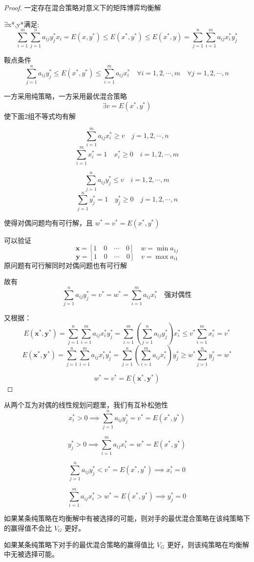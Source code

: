 \documentclass[12pt, a4paper, oneside, UTF8]{ctexbook}
\begin{document}
\begin{proof}
    一定存在混合策略对意义下的矩阵博弈均衡解

$\exists$x*,y*满足:
$$\sum_{i=1}^{m}\sum_{j=1}^{n}a_{ij}y_{j}^{*}x_{i}=E(x,y^{*})\leq E(x^{*},y^{*})\leq E(x^{*},y)=\sum_{j=1}^{n}\sum_{i=1}^{m}a_{ij}x_{i}^{*}y_{j}^{*}$$

鞍点条件
$$\sum_{j=1}^{n}a_{ij}y_{j}^{*}\leq E(x^{*},y^{*})\leq \sum_{i=1}^{m}a_{ij}x_{i}^{*} \quad \forall i=1,2,\cdots,m \quad \forall j=1,2,\cdots,n$$

一方采用纯策略，一方采用最优混合策略
$$\exists v=E(x^{*},y^{*})$$ 使下面2组不等式均有解

$$\sum_{i=1}^{m}a_{ij}x_{i}^{*}\geq v \quad j=1,2,\cdots,n$$
$$\sum_{i=1}^{m}x_{i}^{*}=1 \quad x_{i}^{*}\geq 0 \quad i=1,2,\cdots,m$$

$$\sum_{j=1}^{n}a_{ij}y_{j}^{*}\leq v \quad i=1,2,\cdots,m$$
$$\sum_{j=1}^{n}y_{j}^{*}=1 \quad y_{j}^{*}\geq 0 \quad j=1,2,\cdots,n$$

使得对偶问题均有可行解，且 \( w^* = v^* = E(x^*, y^*) \)

可以验证
\[
\mathbf{x} = [1 \quad 0 \quad \cdots \quad 0] \quad w = \min a_{1j}
\]
\[
\mathbf{y} = [1 \quad 0 \quad \cdots \quad 0] \quad v = \max a_{i1}
\]
原问题有可行解同时对偶问题也有可行解

故有
\[
\sum_{j=1}^{n} a_{ij} y_j^* = v^* = w^* = \sum_{i=1}^{m} a_{ij} x_i^* \quad \text{强对偶性}
\]

又根据：
\[
E(\mathbf{x}^*, \mathbf{y}^*) = \sum_{j=1}^{n} \sum_{i=1}^{m} a_{ij} x_i^* y_j^* = \sum_{i=1}^{m} \left( \sum_{j=1}^{n} a_{ij} y_j^* \right) x_i^* \leq v^* \sum_{i=1}^{m} x_i^* = v^*
\]
\[
E(\mathbf{x}^*, \mathbf{y}^*) = \sum_{j=1}^{n} \sum_{i=1}^{m} a_{ij} x_i^* y_j^* = \sum_{j=1}^{n} \left( \sum_{i=1}^{m} a_{ij} x_i^* \right) y_j^* \geq w^* \sum_{j=1}^{n} y_j^* = w^*
\]

\[
w^* = v^* = E(\mathbf{x}^*, \mathbf{y}^*)
\]

\end{proof}

\begin{theorem}
    从两个互为对偶的线性规划问题里，我们有互补松弛性
\[
x_i^* > 0 \implies \sum_{j=1}^{n} a_{ij} y_j^* = v^* = E(x^*, y^*)
\]

\[
y_j^* > 0 \implies \sum_{i=1}^{m} a_{ij} x_i^* = w^* = E(x^*, y^*)
\]

\[
\sum_{j=1}^{n} a_{ij} y_j^* < v^* = E(x^*, y^*) \implies x_i^* = 0
\]

\[
\sum_{i=1}^{m} a_{ij} x_i^* > w^* = E(x^*, y^*) \implies y_j^* = 0
\]

如果某条纯策略在均衡解中有被选择的可能，则对手的最优混合策略在该纯策略下的赢得值不会比 \(V_G\) 更好。

如果某条纯策略下对手的最优混合策略的赢得值比 \(V_G\) 更好，则该纯策略在均衡解中无被选择可能。
\end{theorem}
\end{document}
